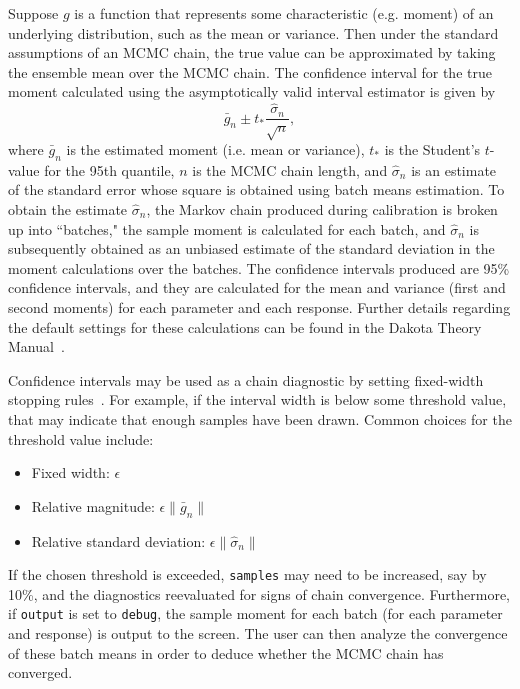 Suppose $g$ is a function that represents some characteristic (e.g.
moment) of an underlying distribution, such as the mean or variance.
Then under the standard assumptions of an MCMC chain,  the true value
can be approximated by taking the ensemble mean over the MCMC chain.
The confidence interval for the true moment calculated using the
asymptotically valid interval estimator is given by~\cite{Fle10}
\begin{equation}
  \bar{g}_{n} \pm t_{*} \frac{\hat{\sigma}_{n}}{\sqrt{n}},
\end{equation}
where $\bar{g}_{n}$ is the estimated moment (i.e. mean or variance),
$t_{*}$ is the Student's $t$-value for the 95th quantile, $n$ is the
MCMC chain length, and $\hat{\sigma}_{n}$ is an estimate of the
standard error whose square is obtained using batch means estimation.
To obtain the estimate $\hat{\sigma}_{n}$, the Markov chain produced
during calibration is broken up into ``batches," the sample moment is
calculated for each batch, and $\hat{\sigma}_{n}$ is subsequently
obtained as an unbiased estimate of the standard deviation in the
moment calculations over the batches. The confidence intervals
produced are 95\% confidence intervals, and they are calculated for
the mean and variance (first and second moments) for each parameter
and each response. Further details regarding the default settings for
these calculations can be found in the Dakota Theory
Manual~\cite{TheoMan}. 

Confidence intervals may be used as a chain diagnostic by setting
fixed-width stopping rules~\cite{Rob18}. For example, if the interval
width is below some threshold value, that may indicate that enough
samples have been drawn. Common choices for the threshold value
include:
\begin{itemize}
  \item Fixed width: $\epsilon$
  \item Relative magnitude: $\epsilon \| \bar{g}_{n} \|$
  \item Relative standard deviation: $\epsilon \| \hat{\sigma}_{n} \|$
\end{itemize}
If the chosen threshold is exceeded, \texttt{samples} may need to be
increased, say by 10\%, and the diagnostics reevaluated for signs of
chain convergence. Furthermore, if \texttt{output} is set to
\texttt{debug}, the sample moment for each batch (for each parameter
and response) is output to the screen. The user can then analyze the
convergence of these batch means in order to deduce whether the MCMC
chain has converged.

